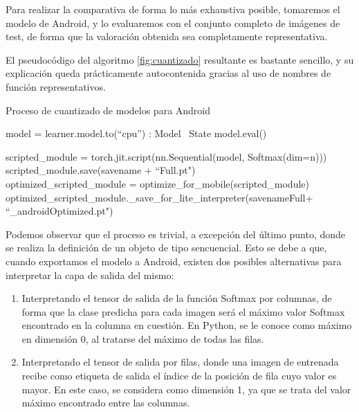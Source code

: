 Para realizar la comparativa de forma lo más exhaustiva posible, tomaremos el modelo de Android, y lo evaluaremos con el conjunto completo de imágenes de test, de forma que la valoración obtenida sea completamente representativa.

El pseudocódigo del algoritmo \ref{fig:cuantizado} resultante es bastante sencillo, y su explicación queda prácticamente autocontenida gracias al uso de nombres de función representativos.

\begin{algorithm}[H]
	\caption{Proceso de cuantizado de modelos para Android}
	\label{fig:cuantizado}
	\begin{algorithmic}
	
		\State model = learner.model.to(``cpu'') : Model
		\ State model.eval()
		
		 \State scripted\_module = torch.jit.script(nn.Sequential(model, Softmax(dim=n))) \\
	 	 \State scripted\_module.save(savename + ``Full.pt")\\  
		 \State optimized\_scripted\_module = optimize\_for\_mobile(scripted\_module) 
		 \State optimized\_scripted\_module.\_save\_for\_lite\_interpreter(savenameFull+ ``\_androidOptimized.pt")
	
		\EndProcedure
		
	\end{algorithmic}
\end{algorithm}

Podemos observar que el proceso es trivial, a excepción del último punto, donde se realiza la definición de un objeto de tipo sencuencial. Esto se debe a que, cuando exportamos el modelo a Android, existen dos posibles alternativas para interpretar la capa de salida del mismo:
\begin{enumerate}
	\item Interpretando el tensor de salida de la función Softmax por columnas, de forma que la clase predicha para cada imagen será el máximo valor Softmax encontrado en la columna en cuestión. En Python, se le conoce como máximo en dimensión 0, al tratarse del máximo de todas las filas.
	\item Interpretando el tensor de salida por filas, donde una imagen de entrenada recibe como etiqueta de salida el índice de la posición de fila cuyo valor es mayor. En este caso, se considera como dimensión 1, ya que se trata del valor máximo encontrado entre las columnas.
 \end{enumerate}

